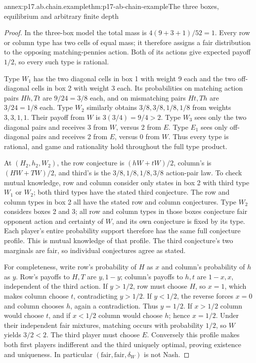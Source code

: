 \begin{annexitem}{annex:p17.ab.chain.example}{thm:p17-ab-chain-example}{The three boxes, equilibrium and arbitrary finite depth}
\begin{proof}
In the three-box model the total mass is
\(4(9+3+1)/52=1\). Every row or column type has two cells
of equal mass; it therefore assigns a fair distribution to
the opposing matching-pennies action. Both of its actions
give expected payoff \(1/2\), so every such type is rational.

Type \(W_1\) has the two diagonal cells in box 1 with weight
9 each and the two off-diagonal cells in box 2 with weight
3 each. Its probabilities on matching action pairs \(Hh,Tt\)
are \(9/24=3/8\) each, and on mismatching pairs \(Ht,Th\)
are \(3/24=1/8\) each. Type \(W_2\) similarly obtains
\(3/8,3/8,1/8,1/8\) from weights \(3,3,1,1\).
Their payoff from \(W\) is \(3(3/4)=9/4>2\).
Type \(W_3\) sees only the two diagonal pairs and receives
3 from \(W\), versus 2 from \(E\).
Type \(E_1\) sees only off-diagonal pairs and receives
2 from \(E\), versus 0 from \(W\).
Thus every type is rational, and game and rationality hold
throughout the full type product.

At \((H_2,h_2,W_2)\), the row conjecture is
\((hW+tW)/2\), column's is \((HW+TW)/2\),
and third's is the \(3/8,1/8,1/8,3/8\) action-pair law.
To check mutual knowledge, row and column consider only
states in box 2 with third type \(W_1\) or \(W_2\);
both third types have the stated third conjecture.
The row and column types in box 2 all have the stated
row and column conjectures. Type \(W_2\) considers boxes
2 and 3; all row and column types in those boxes conjecture
fair opponent action and certainty of \(W\), and its own
conjecture is fixed by its type. Each player's entire
probability support therefore has the same full conjecture
profile. This is mutual knowledge of that profile.
The third conjecture's two marginals are fair, so individual
conjectures agree as stated.

For completeness, write row's probability of \(H\) as \(x\)
and column's probability of \(h\) as \(y\).
Row's payoffs to \(H,T\) are \(y,1-y\); column's payoffs
to \(h,t\) are \(1-x,x\), independent of the third action.
If \(y>1/2\), row must choose \(H\), so \(x=1\), which
makes column choose \(t\), contradicting \(y>1/2\).
If \(y<1/2\), the reverse forces \(x=0\) and column chooses
\(h\), again a contradiction. Thus \(y=1/2\).
If \(x>1/2\) column would choose \(t\), and if \(x<1/2\)
column would choose \(h\); hence \(x=1/2\).
Under their independent fair mixtures, matching occurs
with probability \(1/2\), so \(W\) yields \(3/2<2\).
The third player must choose \(E\). Conversely this profile
makes both first players indifferent and the third uniquely
optimal, proving existence and uniqueness.
In particular \((\text{fair},\text{fair},\delta_W)\) is not Nash.


\end{proof}
\end{annexitem}
